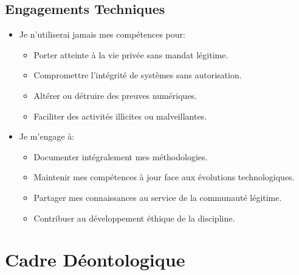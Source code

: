 \documentclass[11pt,a4paper,oneside]{book}
\begin{document}
        \subsection*{Engagements Techniques}
        \begin{itemize}
        \item Je n'utiliserai jamais mes compétences pour:
            \begin{itemize}
                \item Porter atteinte à la vie privée sans mandat légitime.
                \item Compromettre l'intégrité de systèmes sans autorisation.
                \item Altérer ou détruire des preuves numériques.
                \item Faciliter des activités illicites ou malveillantes.
            \end{itemize}
        \item Je m'engage à:
            \begin{itemize}
                \item Documenter intégralement mes méthodologies.
                \item Maintenir mes compétences à jour face aux évolutions technologiques.
                \item Partager mes connaissances au service de la communauté légitime.
                \item Contribuer au développement éthique de la discipline.
            \end{itemize}
        \end{itemize}

        \section*{Cadre Déontologique}
\end{document}
